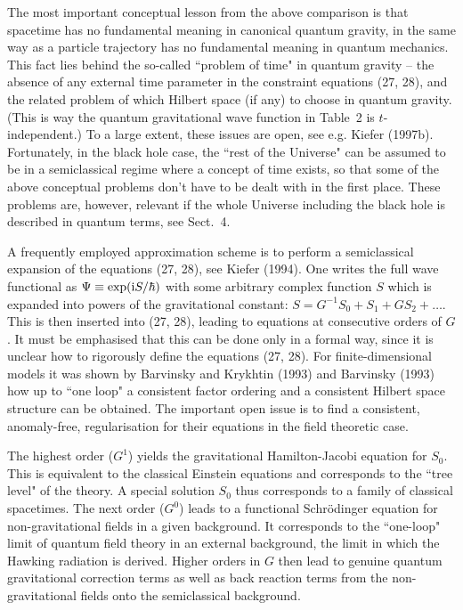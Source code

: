\documentclass[12pt]{article}
\def\I{{\rm i}}
\begin{document}
The most important conceptual lesson from the above comparison
is that spacetime has no fundamental meaning in canonical quantum
gravity, in the same way as a particle trajectory has no 
fundamental meaning in quantum mechanics.
This fact lies behind the so-called ``problem of time" in quantum
gravity -- the absence of any external time parameter in the constraint
equations (27, 28), and the related problem of which Hilbert space
(if any) to choose in quantum gravity. (This is way the
quantum gravitational wave function in Table~2 is $t$-independent.)
 To a large extent, these issues
are open, see e.g. Kiefer (1997b). Fortunately, in the
black hole case, the ``rest of the Universe" can be assumed
to be in a semiclassical regime where a concept of time
exists, so that some of the above conceptual problems don't have
to be dealt with in the first place. These problems are, however,
relevant if the whole Universe including the black hole is described
in quantum terms, see Sect.~4.

A frequently employed approximation scheme is to perform a semiclassical
expansion of the equations (27, 28), see Kiefer (1994).
One writes the full wave functional as $\Psi\equiv\exp(\I S/\hbar)$
with some arbitrary complex function $S$ which is expanded into
powers of the gravitational constant: $S=G^{-1}S_0+S_1
+GS_2+\ldots$. This is then inserted into (27, 28), leading to
equations at consecutive orders of $G$. It must be emphasised that
this can be done only in a formal way, since it is unclear how 
to rigorously define the equations (27, 28). For finite-dimensional
models it was shown by Barvinsky and Krykhtin (1993) and Barvinsky
(1993) how up to ``one loop" a consistent factor ordering
and a consistent Hilbert space structure can be obtained.
The important open issue is to find a consistent, anomaly-free,
regularisation for their equations in the field theoretic case.

 The highest order ($G^1$)
yields the gravitational 
Hamilton-Jacobi equation for $S_0$. This is equivalent 
to the classical Einstein equations and corresponds to the
``tree level" of the theory. A special solution $S_0$ thus corresponds
to a family of classical spacetimes. 
The next order ($G^0$) leads to a functional Schr\"odinger equation
for non-gravitational fields in a given background. 
It corresponds to the ``one-loop"
 limit of quantum field theory in an external
background, the limit in which the Hawking radiation is derived.
Higher orders in $G$ then lead to genuine quantum gravitational
correction terms as well as back reaction terms from the
non-gravitational fields onto the semiclassical background.
\end{document}
